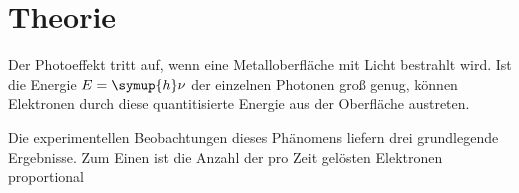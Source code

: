 \section{Theorie}
\label{sec:Theorie}

Der Photoeffekt tritt auf, wenn eine Metalloberfläche mit Licht bestrahlt wird.
Ist die Energie $E=\symup{h}\nu$ der einzelnen Photonen groß genug, können Elektronen durch 
diese quantitisierte Energie aus der Oberfläche austreten.

Die experimentellen Beobachtungen dieses Phänomens liefern drei grundlegende Ergebnisse.
Zum Einen ist die Anzahl der pro Zeit gelösten Elektronen proportional 





\cite{Anleitung}
